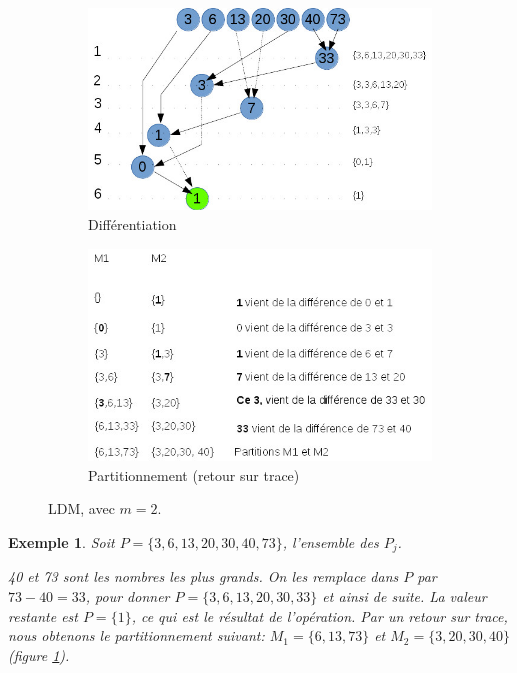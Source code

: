 \documentclass[a4paper,12pt]{report}
\theoremstyle{plain}				%
\newtheorem{example}{Exemple}
\theoremstyle{definition}				%
\begin{document}
\begin{itemize}
\begin{figure}
{\centering}
	\begin{subfigure}[b]{0.45\linewidth}
    \includegraphics[width=\linewidth]
    {Biblio_PCmax_Rendu_exLDM_1_2m.jpg}
    \caption{Différentiation}
  	\end{subfigure}
\hfill%
	\begin{subfigure}[b]{0.45\linewidth}
    \includegraphics[width=\linewidth]
    {Biblio_PCmax_Rendu_exLDM_2_2m.jpg}
    \caption{Partitionnement (retour sur trace)}
  	\end{subfigure}
  	\caption{LDM, avec $m=2$.}
  	\label{fig:LDM2M}
\end{figure}

\begin{example}
Soit $P=\{3,6,13,20,30,40,73\}$, l'ensemble des $P_j$.

40 et 73 sont les nombres les plus grands. On les remplace dans $P$ par $73 - 40 = 33$, pour donner $P=\{3,6,13,20,30,33\}$ et ainsi de suite.
La valeur restante est $P= \{1\}$, ce qui est le résultat de l'opération.
Par un retour sur trace, nous obtenons le partitionnement suivant:
$M_1 = \{ 6,13,73 \}$ et  $M_2 = \{ 3,20,30,40 \}$ (figure \ref{fig:LDM2M}).


\end{example}
\end{itemize}
\end{document}
